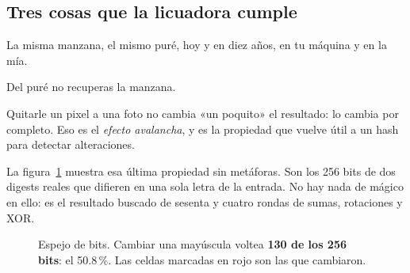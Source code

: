 \documentclass[11pt,a4paper]{article}
\theoremstyle{definition}
\theoremstyle{plain}
\theoremstyle{remark}
\def\avalanchabits{%
  1/0, 1/1, 1/1, 0/0, 1/0, 1/0, 1/1, 1/0, 0/0, 1/1, 1/0, 1/1, 0/1, 1/1, 1/0, 1/1,%
  1/1, 0/0, 0/1, 1/0, 0/0, 1/1, 1/0, 1/0, 1/0, 1/1, 1/0, 0/0, 0/1, 0/1, 0/1, 1/0,%
  0/0, 0/1, 1/0, 1/0, 1/1, 1/1, 0/1, 1/0, 0/1, 0/0, 1/1, 1/0, 1/1, 0/1, 1/1, 0/1,%
  0/0, 1/1, 1/0, 1/1, 0/1, 1/0, 0/0, 1/0, 0/1, 1/1, 0/0, 1/1, 0/0, 0/1, 1/1, 0/0,%
  0/0, 1/0, 1/0, 0/1, 1/1, 0/1, 0/0, 1/0, 0/1, 1/1, 0/1, 0/1, 0/0, 1/0, 1/0, 0/0,%
  1/0, 0/1, 1/0, 0/0, 0/1, 0/0, 1/0, 1/0, 1/1, 0/1, 1/0, 1/1, 1/0, 1/0, 0/0, 0/1,%
  1/0, 1/1, 1/1, 1/0, 0/1, 0/0, 0/0, 0/0, 0/1, 0/0, 0/1, 0/0, 1/1, 1/0, 0/1, 1/0,%
  1/0, 0/1, 1/1, 0/0, 1/1, 1/1, 1/1, 0/1, 1/0, 1/1, 0/0, 0/1, 1/1, 0/1, 0/1, 1/0,%
  1/0, 1/1, 1/0, 1/0, 1/1, 1/0, 0/0, 0/1, 1/0, 0/0, 0/1, 1/0, 1/1, 1/1, 0/0, 0/1,%
  1/1, 0/1, 0/1, 1/0, 1/1, 1/0, 0/1, 0/0, 0/0, 1/0, 0/0, 0/1, 1/0, 1/1, 0/1, 1/0,%
  0/0, 1/1, 0/1, 1/0, 0/1, 0/1, 0/0, 1/1, 1/1, 1/0, 0/0, 1/0, 1/1, 1/0, 0/1, 1/1,%
  1/1, 1/0, 0/1, 0/1, 0/0, 1/1, 1/0, 1/1, 1/0, 1/1, 0/0, 0/0, 1/1, 1/1, 0/1, 0/0,%
  0/1, 1/1, 0/0, 1/0, 1/0, 1/0, 0/0, 1/0, 1/0, 1/1, 1/1, 1/0, 1/1, 0/1, 0/0, 0/0,%
  1/0, 0/0, 0/1, 0/1, 1/0, 0/0, 0/0, 0/0, 1/1, 1/1, 1/0, 1/1, 0/1, 1/1, 1/1, 1/0,%
  0/0, 1/0, 0/0, 0/0, 1/0, 1/1, 0/1, 1/1, 1/1, 1/1, 0/0, 1/1, 0/1, 1/0, 0/1, 0/1,%
  0/0, 0/1, 1/0, 1/1, 0/0, 1/1, 0/1, 0/1, 1/1, 1/1, 0/1, 1/0, 0/0, 0/0, 0/0, 1/1%
}
\begin{document}
\subsection{Tres cosas que la licuadora cumple}

\begin{description}[leftmargin=1.4em,style=unboxed,itemsep=0.3em]
  \item[Es determinista.] La misma manzana, el mismo puré, hoy y en diez años,
    en tu máquina y en la mía.
  \item[No se puede des-licuar.] Del puré no recuperas la manzana.
  \item[Es discontinua a propósito.] Quitarle un pixel a una foto no cambia «un
    poquito» el resultado: lo cambia por completo. Eso es el \emph{efecto
    avalancha}, y es la propiedad que vuelve útil a un hash para detectar
    alteraciones.
\end{description}

La figura~\ref{fig:rejilla} muestra esa última propiedad sin metáforas. Son los
256 bits de dos digests reales que difieren en una sola letra de la entrada. No
hay nada de mágico en ello: es el resultado buscado de sesenta y cuatro rondas de
sumas, rotaciones y XOR.

\begin{figure}[htbp]
\centering
{}
\caption{Espejo de bits. Cambiar una mayúscula voltea \textbf{130 de los 256
bits}: el 50.8\,\%. Las celdas marcadas en rojo son las que cambiaron.}
\label{fig:rejilla}
\end{figure}
\end{document}
